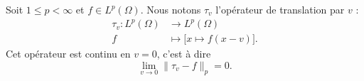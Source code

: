 \begin{lemma}   \label{LemCUlJzkA}
    Soit \( 1\leq p<\infty\) et \( f\in L^p(\Omega)\). Nous notons \( \tau_v\) l'opérateur de translation par \( v\) :
    \begin{equation}
        \begin{aligned}
            \tau_v\colon L^p(\Omega)&\to L^p(\Omega) \\
            f&\mapsto \Big[ x\mapsto f(x-v) \Big]. 
        \end{aligned}
    \end{equation}
    Cet opérateur est continu en \( v=0\), c'est à dire
    \begin{equation}
        \lim_{v\to 0}\| \tau_v-f \|_p=0.
    \end{equation}
\end{lemma}

